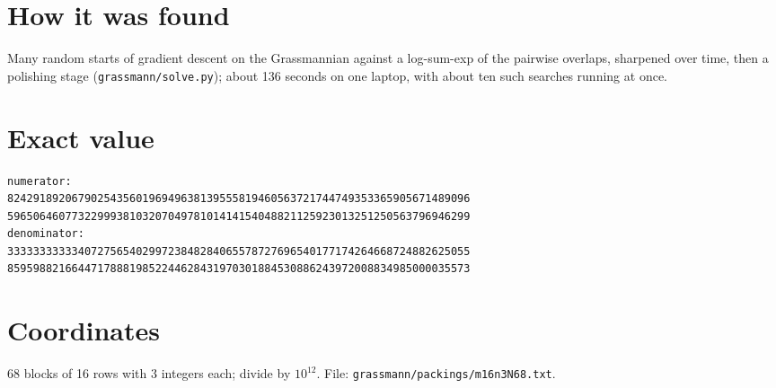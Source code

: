 \documentclass[11pt,a4paper]{article}
\begin{document}
\section{How it was found}
Many random starts of gradient descent on the Grassmannian against a log-sum-exp of the pairwise overlaps, sharpened over time, then a polishing stage (\texttt{grassmann/solve.py}); about 136 seconds on one laptop, with about ten such searches running at once.


\appendix
\section{Exact value}
{\small
\begin{verbatim}
numerator:
824291892067902543560196949638139555819460563721744749353365905671489096
596506460773229993810320704978101414154048821125923013251250563796946299
denominator:
333333333334072756540299723848284065578727696540177174264668724882625055
859598821664471788819852244628431970301884530886243972008834985000035573
\end{verbatim}}

\section{Coordinates}
68 blocks of 16 rows with 3 integers each; divide by $10^{12}$. File: \texttt{grassmann/packings/m16n3N68.txt}.
{\tiny
\begin{multicols}{3}
\end{multicols}}
\end{document}
